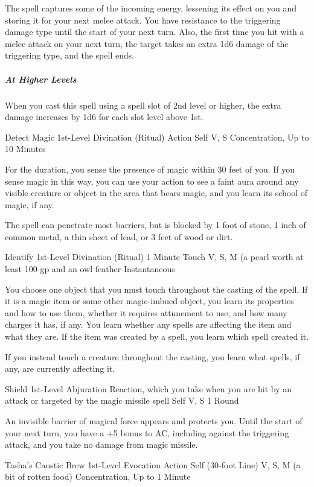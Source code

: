 \documentclass[letterpaper,openany,oneside,twocolumn]{book}
\begin{document}
The spell captures some of the incoming energy, lessening its effect on you and storing it for your next melee attack. You have resistance to the triggering damage type until the start of your next turn. Also, the first time you hit with a melee attack on your next turn, the target takes an extra 1d6 damage of the triggering type, and the spell ends.

\subparagraph*{At Higher Levels} When you cast this spell using a spell slot of 2nd level or higher, the extra damage increases by 1d6 for each slot level above 1st.

\DndSpellHeader
  {Detect Magic}
  {1st-Level Divination (Ritual)}
  {Action}
  {Self}
  {V, S}
  {Concentration, Up to 10 Minutes}

For the duration, you sense the presence of magic within 30 feet of you. If you sense magic in this way, you can use your action to see a faint aura around any visible creature or object in the area that bears magic, and you learn its school of magic, if any.

The spell can penetrate most barriers, but is blocked by 1 foot of stone, 1 inch of common metal, a thin sheet of lead, or 3 feet of wood or dirt.

\DndSpellHeader
  {Identify}
  {1st-Level Divination (Ritual)}
  {1 Minute}
  {Touch}
  {V, S, M (a pearl worth at least 100 gp and an owl feather}
  {Instantaneous}

You choose one object that you must touch throughout the casting of the spell. If it is a magic item or some other magic-imbued object, you learn its properties and how to use them, whether it requires attunement to use, and how many charges it has, if any. You learn whether any spells are affecting the item and what they are. If the item was created by a spell, you learn which spell created it.

If you instead touch a creature throughout the casting, you learn what spells, if any, are currently affecting it.

\DndSpellHeader
  {Shield}
  {1st-Level Abjuration}
  {Reaction, which you take when you are hit by an attack or targeted by the magic missile spell}
  {Self}
  {V, S}
  {1 Round}

An invisible barrier of magical force appears and protects you. Until the start of your next turn, you have a +5 bonus to AC, including against the triggering attack, and you take no damage from magic missile.

\DndSpellHeader
  {Tasha's Caustic Brew}
  {1st-Level Evocation}
  {Action}
  {Self (30-foot Line)}
  {V, S, M (a bit of rotten food)}
  {Concentration, Up to 1 Minute}
\end{document}
